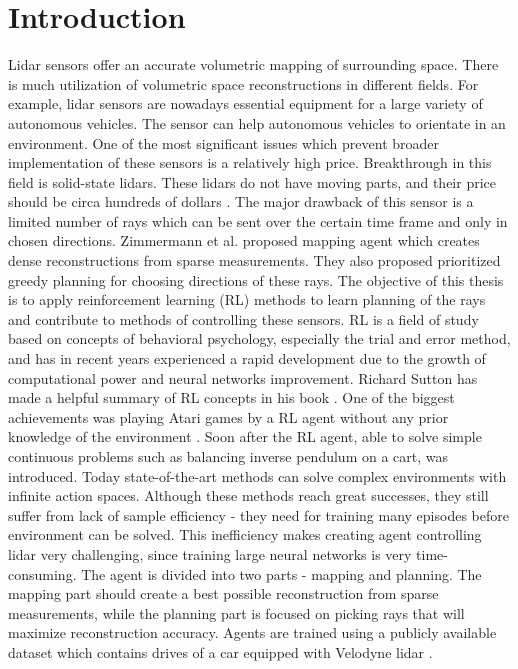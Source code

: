 \section{Introduction}

Lidar sensors offer an accurate volumetric mapping of surrounding space. There is much utilization of volumetric space reconstructions in different fields. For example, lidar sensors are nowadays essential equipment for a large variety of autonomous vehicles. The sensor can help autonomous vehicles to orientate in an environment. One of the most significant issues which prevent broader implementation of these sensors is a relatively high price. Breakthrough in this field is solid-state lidars. These lidars do not have moving parts, and their price should be circa hundreds of dollars \cite{quanergy2016}. The major drawback of this sensor is a limited number of rays which can be sent over the certain time frame and only in chosen directions. Zimmermann et al. \cite{zimmermann2017} proposed mapping agent which creates dense reconstructions from sparse measurements. They also proposed prioritized greedy planning for choosing directions of these rays. The objective of this thesis is to apply reinforcement learning (RL) methods to learn planning of the rays and contribute to methods of controlling these sensors. RL is a field of study based on concepts of behavioral psychology, especially the trial and error method, and has in recent years experienced a rapid development due to the growth of computational power and neural networks improvement. Richard Sutton has made a helpful summary of RL concepts in his book \cite{sutton2012}. One of the biggest achievements was playing Atari games by a RL agent without any prior knowledge of the environment \cite{mnih2015}. Soon after the RL agent, able to solve simple continuous problems such as balancing inverse pendulum on a cart, was introduced. Today state-of-the-art methods can solve complex environments with infinite action spaces. Although these methods reach great successes, they still suffer from lack of sample efficiency - they need for training many episodes before environment can be solved. This inefficiency makes creating agent controlling lidar very challenging, since training large neural networks is very time-consuming. The agent is divided into two parts - mapping and planning. The mapping part should create a best possible reconstruction from sparse measurements, while the planning part is focused on picking rays that will maximize reconstruction accuracy. Agents are trained using a publicly available dataset which contains drives of a car equipped with Velodyne lidar \cite{geiger2013}. 
  